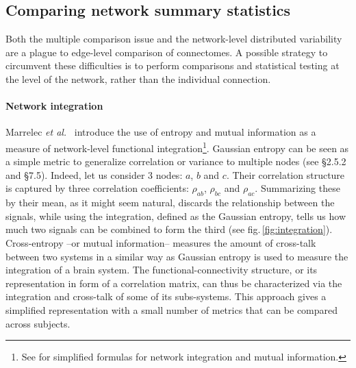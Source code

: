 \documentclass[5p]{elsarticle}
\begin{document}

\subsection{Comparing network summary statistics}

Both the multiple comparison issue and the network-level distributed
variability are a plague to edge-level comparison of connectomes. A
possible strategy to circumvent these difficulties is to perform
comparisons and statistical testing at the level of the network, rather
than the individual connection. 

\paragraph{Network integration}
%
Marrelec \emph{et al.}\
\cite{marrelec2008} introduce the use of entropy and mutual information
as a measure of network-level functional integration\footnote{See \cite{varoquaux2010c}
for simplified formulas for network integration and mutual information.}.
Gaussian entropy can be seen as a simple metric to generalize correlation
or variance to multiple nodes (see \cite{anderson1958} \S2.5.2 and
\S7.5). Indeed, let us consider 3 nodes: $a$, $b$ and $c$. Their
correlation structure is captured by three correlation coefficients:
$\rho_{ab}$, $\rho_{bc}$ and $\rho_{ac}$. Summarizing these by their
mean, as it might seem natural, discards the relationship between the
signals, while using the integration, defined as the Gaussian entropy, tells us how much two signals can be
combined to form the third (see fig.\,\ref{fig:integration}). 
Cross-entropy --or mutual information--
\cite{marrelec2008} measures the amount of cross-talk between two
systems in a similar way as Gaussian entropy is used to measure the
integration of a brain
system. The functional-connectivity structure, or its representation in
form of a correlation matrix, can thus be characterized via the
integration and cross-talk of some of its subs-systems. This approach
gives a simplified representation with a small number of metrics that can
be compared across subjects.
\end{document}
